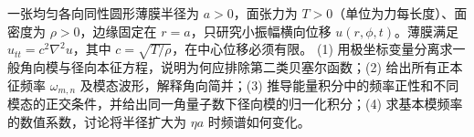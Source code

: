 一张均匀各向同性圆形薄膜半径为 \(a>0\)，面张力为 \(T>0\)（单位为力每长度）、面密度为 \(\rho>0\)，边缘固定在 \(r=a\)，只研究小振幅横向位移 \(u(r,\phi,t)\)。薄膜满足 \(u_{tt}=c^2\nabla^2u\)，其中 \(c=\sqrt{T/\rho}\)，在中心位移必须有限。
(1) 用极坐标变量分离求一般角向模与径向本征方程，说明为何应排除第二类贝塞尔函数；(2) 给出所有正本征频率 \(\omega_{m,n}\) 及模态波形，解释角向简并；(3) 推导能量积分中的频率正性和不同模态的正交条件，并给出同一角量子数下径向模的归一化积分；(4) 求基本模频率的数值系数，讨论将半径扩大为 \(\eta a\) 时频谱如何变化。

